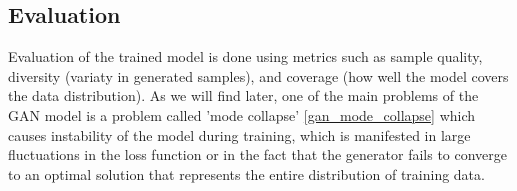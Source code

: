 \subsection{Evaluation}

Evaluation of the trained model is done using metrics such as sample quality, diversity (variaty in generated samples), and coverage (how well the model covers the data distribution). As we will find later, one of the main problems of the GAN model is a problem called 'mode collapse' \ref{gan_mode_collapse} which causes instability of the model during training, which is manifested in large fluctuations in the loss function or in the fact that the generator fails to converge to an optimal solution that represents the entire distribution of training data.